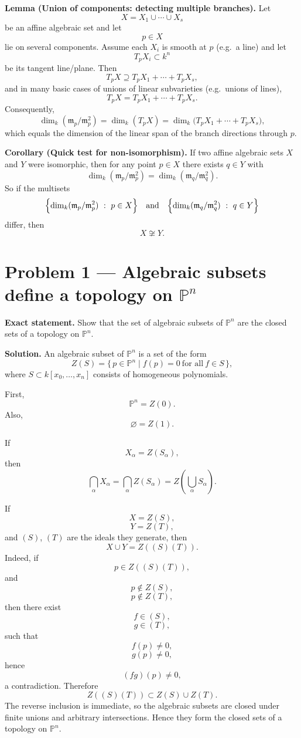 \documentclass[12pt,a4paper]{article}
\theoremstyle{plain}
\theoremstyle{definition}      %
\begin{document}
\medskip

\textbf{Lemma (Union of components: detecting multiple branches).}
Let
\[
X=X_1\cup\cdots\cup X_s
\]
be an affine algebraic set and let
\[
p\in X
\]
lie on several components.
Assume each $X_i$ is smooth at $p$ (e.g.\ a line) and let
\[
T_pX_i\subset k^n
\]
be its tangent line/plane.
Then
\[
T_pX \supseteq T_pX_1+\cdots+T_pX_s,
\]
and in many basic cases of unions of linear subvarieties (e.g.\ unions of lines),
\[
T_pX = T_pX_1+\cdots+T_pX_s.
\]
Consequently,
\[
\dim_k(\mathfrak m_p/\mathfrak m_p^2)
=
\dim_k(T_pX)
=
\dim_k\bigl(T_pX_1+\cdots+T_pX_s\bigr),
\]
which equals the dimension of the linear span of the branch directions through $p$.

\medskip

\textbf{Corollary (Quick test for non-isomorphism).}
If two affine algebraic sets $X$ and $Y$ were isomorphic, then for any point $p\in X$ there exists $q\in Y$ with
\[
\dim_k(\mathfrak m_p/\mathfrak m_p^2)
=
\dim_k(\mathfrak m_q/\mathfrak m_q^2).
\]
So if the multisets
\[
\Bigl\{\dim_k(\mathfrak m_p/\mathfrak m_p^2)\ :\ p\in X\Bigr\}
\quad\text{and}\quad
\Bigl\{\dim_k(\mathfrak m_q/\mathfrak m_q^2)\ :\ q\in Y\Bigr\}
\]
differ, then
\[
X\not\cong Y.
\]

\section*{Problem 1 — Algebraic subsets define a topology on $\mathbb{P}^n$}

\textbf{Exact statement.}
Show that the set of algebraic subsets of $\mathbb{P}^n$ are the closed sets of a topology on $\mathbb{P}^n$.

\textbf{Solution.}
An algebraic subset of $\mathbb{P}^n$ is a set of the form
\[
Z(S)
=
\{\,p\in \mathbb{P}^n \mid f(p)=0\ \text{for all}\ f\in S\,\},
\]
where $S\subset k[x_0,\dots,x_n]$ consists of homogeneous polynomials.

First,
\[
\mathbb{P}^n
=
Z(0).
\]
Also,
\[
\varnothing
=
Z(1).
\]

If
\[
X_\alpha
=
Z(S_\alpha),
\]
then
\[
\bigcap_\alpha X_\alpha
=
\bigcap_\alpha Z(S_\alpha)
=
Z\!\left(\bigcup_\alpha S_\alpha\right).
\]

If
\[
X
=
Z(S),
\]
\[
Y
=
Z(T),
\]
and $(S)$, $(T)$ are the ideals they generate, then
\[
X\cup Y
=
Z((S)(T)).
\]
Indeed, if
\[
p\in Z((S)(T)),
\]
and
\[
p\notin Z(S),
\]
\[
p\notin Z(T),
\]
then there exist
\[
f\in (S),
\]
\[
g\in (T),
\]
such that
\[
f(p)\neq 0,
\]
\[
g(p)\neq 0,
\]
hence
\[
(fg)(p)\neq 0,
\]
a contradiction.
Therefore
\[
Z((S)(T))
\subset
Z(S)\cup Z(T).
\]
The reverse inclusion is immediate, so the algebraic subsets are closed under finite unions and arbitrary intersections.
Hence they form the closed sets of a topology on $\mathbb{P}^n$.
\end{document}
